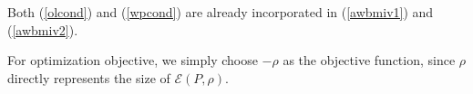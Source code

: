 \documentclass[10pt,final,journal,twoside]{IEEEtran}
\begin{document}
Both (\ref{olcond}) and (\ref{wpcond}) are already incorporated in (\ref{awbmiv1}) and (\ref{awbmiv2}).\par
For optimization objective, we simply choose $-\rho$ as the objective function, since $\rho$ directly represents the size of $\mathcal{E}(P,\rho)$.
\end{document}
